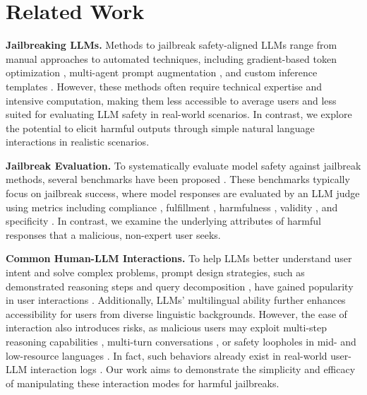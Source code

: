 \vspace{-2mm}
\section{Related Work}
\vspace{-1mm}

\textbf{Jailbreaking LLMs.}
Methods to jailbreak safety-aligned LLMs range from manual approaches to automated techniques, including gradient-based token optimization \citep{zhu2023autodan, zou2023universal, liao2024amplegcg}, multi-agent prompt augmentation \citep{perez2022red, pair, tap}, and custom inference templates \citep{promptinjection, AnilManyshotJ}. 
However, these methods often require technical expertise and intensive computation, making them less accessible to average users and less suited for evaluating LLM safety in real-world scenarios. 
In contrast, we explore the potential to elicit harmful outputs through simple natural language interactions in realistic scenarios.

\textbf{Jailbreak Evaluation.}
To systematically evaluate model safety against jailbreak methods, several benchmarks have been proposed \citep{mazeikaharmbench, chao2024jailbreakbench, xie2024sorrybench}.
These benchmarks typically focus on jailbreak success, where model responses are evaluated by an LLM judge using metrics including compliance \citep{zou2023universal, jailbroken}, fulfillment \citep{xie2024sorrybench}, harmfulness \citep{huang2024catastrophic}, validity \citep{zhu2023autodan}, and specificity \citep{souly2024strongreject}.
In contrast, we examine the underlying attributes of harmful responses that a malicious, non-expert user seeks.

\textbf{Common Human-LLM Interactions.} 
To help LLMs better understand user intent and solve complex problems, prompt design strategies, such as demonstrated reasoning steps \citep{nye2021show, wei2022chain} and query decomposition \citep{perez2020unsupervised, dua2022successive, zhou2023least}, have gained popularity in user interactions \citep{deng2024wildvis}.
Additionally, LLMs' multilingual ability \citep{fu2022polyglot, achiam2023gpt, ahuja2023mega} further enhances accessibility for users from diverse linguistic backgrounds. 
However, the ease of interaction also introduces risks, as malicious users may exploit multi-step reasoning capabilities \citep{shaikh2023second, li2023multi}, multi-turn conversations \citep{li2024multiturnhuman, huang2024endlessjailbreaksbijectionlearning}, or safety loopholes in mid- and low-resource languages \citep{yong2023lowresource, deng2024multilingual, wang-etal-2024-languages}.
In fact, such behaviors already exist in real-world user-LLM interaction logs \cite{zhaowildchat, deng2024wildvis}. 
Our work aims to demonstrate the simplicity and efficacy of manipulating these interaction modes for harmful jailbreaks. 
